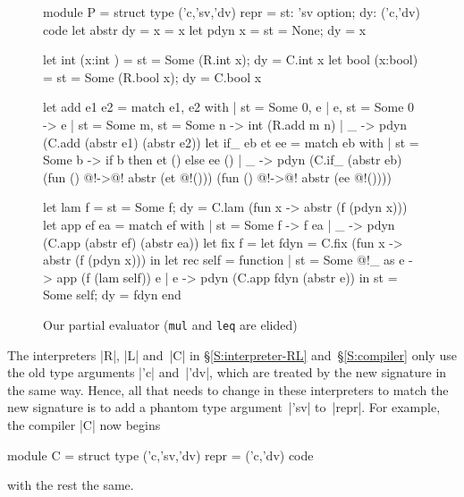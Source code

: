 \begin{figure}
\begin{floatrule}
\begin{code2}[commandchars=\@\[\]]
module P = struct
  type ('c,'sv,'dv) repr = {st: 'sv option; dy: ('c,'dv) code}
  let abstr {dy = x} = x
  let pdyn x = {st = None; dy = x}

  let int  (x:int ) = {st = Some (R.int  x); dy = C.int  x}
  let bool (x:bool) = {st = Some (R.bool x); dy = C.bool x}

  let add e1 e2 = match e1, e2 with
                  | {st = Some 0}, e | e, {st = Some 0} -> e
                  | {st = Some m}, {st = Some n} -> int (R.add m n)
                  | _ -> pdyn (C.add (abstr e1) (abstr e2))
  let if_ eb et ee = match eb with
                     | {st = Some b} -> if b then et () else ee ()
                     | _ -> pdyn (C.if_ (abstr eb) (fun () @!->@! abstr (et @!()))
                                                   (fun () @!->@! abstr (ee @!())))

  let lam f = {st = Some f; dy = C.lam (fun x -> abstr (f (pdyn x)))}
  let app ef ea = match ef with
                  | {st = Some f} -> f ea
                  | _ -> pdyn (C.app (abstr ef) (abstr ea))
  let fix f = let fdyn = C.fix (fun x -> abstr (f (pdyn x)))
              in let rec self = function
                                | {st = Some @!_} as e -> app (f (lam self)) e
                                | e -> pdyn (C.app fdyn (abstr e))
                 in {st = Some self; dy = fdyn}
end
\end{code2}
\end{floatrule}
\caption{Our partial evaluator (\texttt{mul} and \texttt{leq}
  are elided)}
\label{fig:pe}
\end{figure}

The interpreters |R|, |L| and~|C| in \S\ref{S:interpreter-RL} and~\S\ref{S:compiler}
only use the old
type arguments |'c| and~|'dv|, which are treated by the new signature
in the same way.  Hence, all that needs to change in these interpreters
to match the new signature is to add a phantom type
argument~|'sv| to~|repr|.
For example, the compiler |C| now begins
\begin{code}
module C = struct
  type ('c,'sv,'dv) repr = ('c,'dv) code
\end{code}
with the rest the same.

